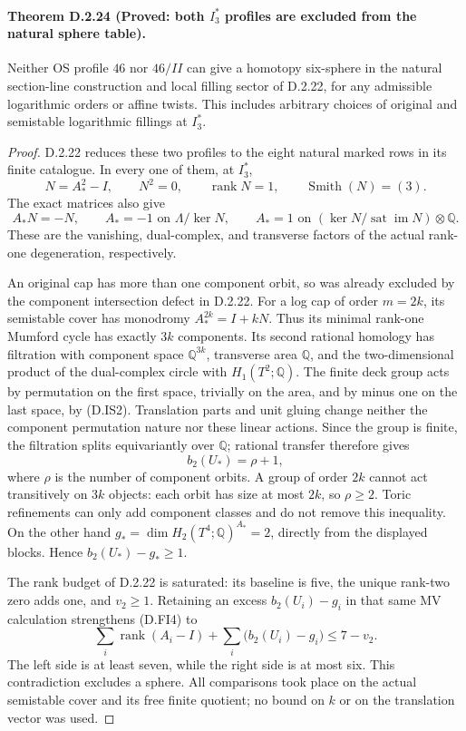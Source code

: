 \paragraph{Theorem D.2.24 (Proved: both $I_3^*$ profiles are excluded from the natural sphere table).}
Neither OS profile $46$ nor $46/II$ can give a homotopy six-sphere
in the natural section-line construction and local filling sector
of D.2.22, for any admissible logarithmic orders or affine twists.
This includes arbitrary choices of original and semistable logarithmic
fillings at $I_3^*$.
\begin{proof}
D.2.22 reduces these two profiles to the eight natural marked rows
in its finite catalogue. In every one of them, at $I_3^*$,
\[
 N=A_*^2-I,\qquad N^2=0,\qquad \operatorname{rank}N=1,
 \qquad \operatorname{Smith}(N)=(3).                         \tag{D.IS1}
\]
The exact matrices also give
\[
 A_*N=-N,\qquad
 A_*=-1\text{ on }\Lambda/\ker N,\qquad
 A_*=1\text{ on }(\ker N/\operatorname{sat}\operatorname{im}N)
                         \otimes\mathbb Q.                 \tag{D.IS2}
\]
These are the vanishing, dual-complex, and transverse factors of the
actual rank-one degeneration, respectively.

An original cap has more than one component orbit, so was already
excluded by the component intersection defect in D.2.22. For a log
cap of order $m=2k$, its semistable cover has monodromy
$A_*^{2k}=I+kN$. Thus its minimal rank-one Mumford cycle has exactly
$3k$ components. Its second rational homology has filtration with
component space $\mathbb Q^{3k}$, transverse area $\mathbb Q$, and
the two-dimensional product of the dual-complex circle with
$H_1(T^2;\mathbb Q)$. The finite deck group acts by permutation on
the first space, trivially on the area, and by minus one on the last
space, by (D.IS2). Translation parts and unit gluing change neither
the component permutation nature nor these linear actions. Since the
group is finite, the filtration splits equivariantly over $\mathbb Q$;
rational transfer therefore gives
\[
                         b_2(U_*)=\rho+1,
\]
where $\rho$ is the number of component orbits. A group of order
$2k$ cannot act transitively on $3k$ objects: each orbit has size at
most $2k$, so $\rho\ge2$. Toric refinements can only add component
classes and do not remove this inequality. On the other hand
$g_*=\dim H_2(T^4;\mathbb Q)^{A_*}=2$, directly from the displayed
blocks. Hence $b_2(U_*)-g_*\ge1$.

The rank budget of D.2.22 is saturated: its baseline is five, the
unique rank-two zero adds one, and $v_2\ge1$. Retaining an excess
$b_2(U_i)-g_i$ in that same MV calculation strengthens (D.FI4) to
\[
 \sum_i\operatorname{rank}(A_i-I)
 +\sum_i\bigl(b_2(U_i)-g_i\bigr)\le7-v_2.
\]
The left side is at least seven, while the right side is at most
six. This contradiction excludes a sphere. All comparisons took
place on the actual semistable cover and its free finite quotient;
no bound on $k$ or on the translation vector was used.
\end{proof}
